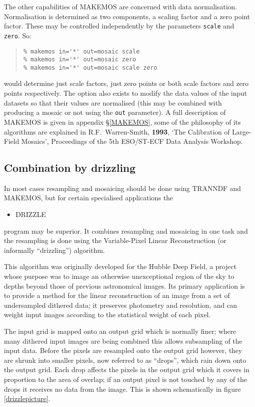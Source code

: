 \documentclass[twoside,11pt]{article}
\newcommand{\hyperref}[4]{#2\ref{#4}#3}
\newcommand{\htmlref}[2]{#1}
\newcommand{\xlabel}[1]{}
\renewcommand{\_}{\texttt{\symbol{95}}}
\newenvironment{myquote}{\begin{quote}\begin{small}}{\end{small}\end{quote}}
\newcommand{\text}[1]{{\small \tt #1}}
\newcommand{\routine}[1]{{\sc #1}}
\newcommand{\xroutine}[1]{\htmlref{{\sc #1}}{#1}}
\begin{document}
The other capabilities of \routine{MAKEMOS} are concerned 
with data normalisation.
Normalisation is determined as two components, a scaling factor and a
zero point factor. These may be controlled independently by the
parameters \text{scale} and \text{zero}. So:
\begin{myquote}
\begin{verbatim}
% makemos in='*' out=mosaic scale
% makemos in='*' out=mosaic zero
% makemos in='*' out=mosaic scale zero
\end{verbatim}
\end{myquote}
would determine just scale factors, just zero points or both scale
factors and zero points respectively. The option also exists to modify
the data values of the input datasets so that their values are
normalised (this may be combined with producing a mosaic or not using
the \text{out} parameter). A full description of \routine{MAKEMOS}
is given in appendix \S\ref{MAKEMOS}, some of the philosophy of
its algorithms are explained in R.F.~Warren-Smith, {\bf 1993},
`The Calibration of Large-Field Mosaics', Proceedings of the 5th
ESO/ST-ECF Data Analysis Workshop.


\subsection{\label{drizzling}\xlabel{drizzling}Combination by drizzling}

In most cases resampling and mosaicing should be done using
\routine{TRANNDF} and \routine{MAKEMOS}, but for certain specialised
applications the
\begin{itemize}
\item \xroutine{DRIZZLE}
\end{itemize}
program may be superior. 
It combines resampling and mosaicing in one task
and the resampling is done using the Variable-Pixel Linear Reconstruction
(or informally ``drizzling'') algorithm.

This algorithm was originally developed for the Hubble Deep
Field, a project whose purpose was to image an otherwise unexceptional
region of the sky to depths beyond those of previous astronomical images.
Its primary application is to provide a method for the linear
reconstruction of an image from a set of undersampled dithered data;
it preserves photometry and resolution, and can weight input images
according to the statistical weight of each pixel.

The input grid is mapped onto an output grid which is normally
finer; where many dithered input images are being combined this
allows subsampling of the input data.
Before the pixels are resampled onto the output grid however,
they are shrunk into smaller pixels, now referred to as ``drops'',
which rain down onto the output grid.
Each drop affects the pixels in the output grid which it covers
in proportion to the area of overlap; if an output pixel is
not touched by any of the drops it receives no data from the image.
This is shown schematically 
in \hyperref{the figure}{figure }{}{drizzlepicture}.
\end{document}
